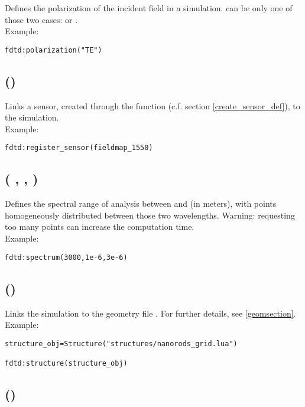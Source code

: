 Defines the polarization of the incident field in a simulation.  can be only one of those two cases:  or .\\ Example:
\begin{lstlisting}
fdtd:polarization("TE")
\end{lstlisting}

\subsection[register\_sensor]{()}

Links a sensor, created through the  function (c.f. section \ref{create_sensor_def}), to the simulation. \\ Example:
\begin{lstlisting}
fdtd:register_sensor(fieldmap_1550)
\end{lstlisting}

\subsection[spectrum]{( ,  , )}

Defines the spectral range of analysis between  and  (in meters), with  points homogeneously distributed between those two wavelengths. Warning: requesting too many points can increase the computation time.\\ Example:
\begin{lstlisting}
fdtd:spectrum(3000,1e-6,3e-6)
\end{lstlisting}

\subsection[structure]{()}

Links the simulation to the geometry file . For further details, see \ref{geomsection}.\\ Example:
\begin{lstlisting}
structure_obj=Structure("structures/nanorods_grid.lua")

fdtd:structure(structure_obj)
\end{lstlisting}

\subsection[struct\_append]{()}

